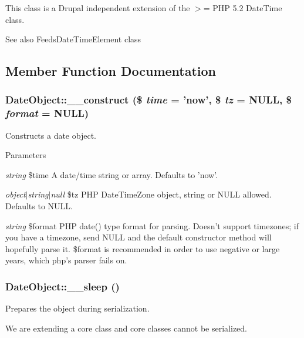 This class is a Drupal independent extension of the $>$= PHP 5.2 DateTime class.

\begin{DoxySeeAlso}{See also}
FeedsDateTimeElement class 
\end{DoxySeeAlso}


\subsection{Member Function Documentation}
\hypertarget{classDateObject_a51c14ca40ce3c847f12057055a7899cc}{
\subsubsection[{\_\-\_\-construct}]{\setlength{\rightskip}{0pt plus 5cm}DateObject::\_\-\_\-construct (\$ {\em time} = {\ttfamily 'now'}, \/  \$ {\em tz} = {\ttfamily NULL}, \/  \$ {\em format} = {\ttfamily NULL})}}
\label{classDateObject_a51c14ca40ce3c847f12057055a7899cc}
Constructs a date object.


\begin{DoxyParams}{Parameters}
\item[{\em string}]\$time A date/time string or array. Defaults to 'now'. \item[{\em object$|$string$|$null}]\$tz PHP DateTimeZone object, string or NULL allowed. Defaults to NULL. \item[{\em string}]\$format PHP date() type format for parsing. Doesn't support timezones; if you have a timezone, send NULL and the default constructor method will hopefully parse it. \$format is recommended in order to use negative or large years, which php's parser fails on. \end{DoxyParams}
\hypertarget{classDateObject_a9a90ad5b8fd69379eba62dd07e0aaa6e}{
\subsubsection[{\_\-\_\-sleep}]{\setlength{\rightskip}{0pt plus 5cm}DateObject::\_\-\_\-sleep ()}}
\label{classDateObject_a9a90ad5b8fd69379eba62dd07e0aaa6e}
Prepares the object during serialization.

We are extending a core class and core classes cannot be serialized.


